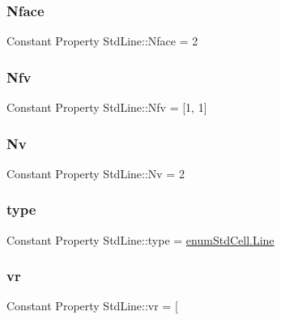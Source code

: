 \mbox{\label{class_std_line_a26ccc52206bdbdc35ef705588f527fa2}} 
\subsubsection{\texorpdfstring{Nface}{Nface}}
{\footnotesize\ttfamily Constant Property Std\+Line\+::\+Nface = 2}

\mbox{\label{class_std_line_a489ccf1aa8117706e16d358a2745eadd}} 
\subsubsection{\texorpdfstring{Nfv}{Nfv}}
{\footnotesize\ttfamily Constant Property Std\+Line\+::\+Nfv = \mbox{[}1, 1\mbox{]}\textquotesingle{}}

\mbox{\label{class_std_line_a3e9bfcad0d9700b242c1ca5b70ef37c3}} 
\subsubsection{\texorpdfstring{Nv}{Nv}}
{\footnotesize\ttfamily Constant Property Std\+Line\+::\+Nv = 2}

\mbox{\label{class_std_line_a9d3e0fb400f46f89996c1202bab6593b}} 
\subsubsection{\texorpdfstring{type}{type}}
{\footnotesize\ttfamily Constant Property Std\+Line\+::type = \hyperlink{classenum_std_cell_ac4c2fa4e189e76e103f3ff9b1d19b9e7afd257c7a2b7d6efb3bd9f67c8a36d3cd}{enum\+Std\+Cell.\+Line}}

\mbox{\label{class_std_line_a91fd0e5061ea26162737d6820a12604e}} 
\subsubsection{\texorpdfstring{vr}{vr}}
{\footnotesize\ttfamily Constant Property Std\+Line\+::vr = \mbox{[}}

